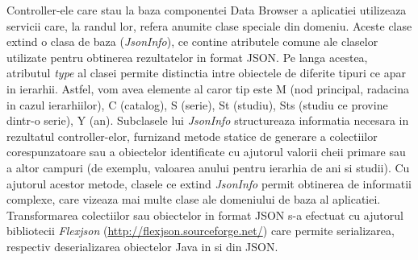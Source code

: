 Controller-ele care stau la baza componentei Data Browser a aplicatiei utilizeaza servicii care, la randul lor, refera anumite clase speciale din domeniu. 
Aceste clase extind o clasa de baza (\emph{JsonInfo}), ce contine atributele comune ale claselor utilizate pentru obtinerea rezultatelor in format JSON. 
Pe langa acestea, atributul \emph{type} al clasei permite distinctia intre obiectele de diferite tipuri ce apar in ierarhii. 
Astfel, vom avea elemente al caror tip este M (nod principal, radacina in cazul ierarhiilor), C (catalog), S (serie), St (studiu), Sts (studiu ce provine dintr-o serie), Y (an).  
Subclasele lui \emph{JsonInfo} structureaza informatia necesara in rezultatul controller-elor, furnizand metode statice de generare a colectiilor corespunzatoare sau a obiectelor identificate cu ajutorul valorii cheii primare sau a altor campuri (de exemplu, valoarea anului pentru ierarhia de ani si studii). Cu ajutorul acestor metode, clasele ce extind \emph{JsonInfo} permit obtinerea de informatii complexe, care vizeaza mai multe clase ale domeniului de baza al aplicatiei.
Transformarea colectiilor sau obiectelor in format JSON s-a efectuat cu ajutorul bibliotecii \emph{Flexjson} (\url{http://flexjson.sourceforge.net/}) care permite serializarea, respectiv deserializarea obiectelor Java in si din JSON.  

